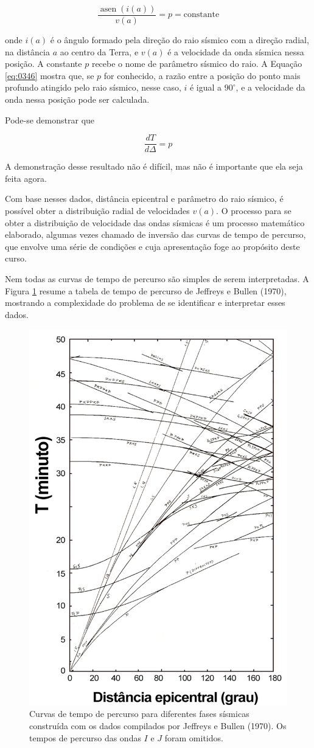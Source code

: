\documentclass[]{book}
\theoremstyle{definition}
\theoremstyle{definition}
\theoremstyle{definition}
\theoremstyle{remark}
\begin{document}
\begin{equation}
\frac{\operatorname{asen}(i(a))}{v(a)}=p= \mathrm{constante} \label{eq:0346}
\end{equation}

onde \(i(a)\) é o ângulo formado pela direção do raio sísmico com a direção radial, na distância \(a\) ao centro da Terra, e \(v(a)\) é a velocidade da onda sísmica nessa posição. A constante \(p\) recebe o nome de parâmetro sísmico do raio. A Equação \eqref{eq:0346} mostra que, se \(p\) for conhecido, a razão entre a posição do ponto mais profundo atingido pelo raio sísmico, nesse caso, \(i\) é igual a \(90^\circ\), e a velocidade da onda nessa posição pode ser calculada.

Pode-se demonstrar que

\begin{equation}
\frac{d T}{d \Delta}=p \label{eq:0347}
\end{equation}

A demonstração desse resultado não é difícil, mas não é importante que ela seja feita agora.

Com base nesses dados, distância epicentral e parâmetro do raio sísmico, é possível obter a distribuição radial de velocidades \(v(a)\). O processo para se obter a distribuição de velocidade das ondas sísmicas é um processo matemático elaborado, algumas vezes chamado de inversão das curvas de tempo de percurso, que envolve uma série de condições e cuja apresentação foge ao propósito deste curso.

Nem todas as curvas de tempo de percurso são simples de serem interpretadas. A Figura \ref{fig:usp0416} resume a tabela de tempo de percurso de Jeffreys e Bullen (1970), mostrando a complexidade do problema de se identificar e interpretar esses dados.

\begin{figure}

{\centering \includegraphics[width=0.5\linewidth]{fig/figU16} 

}

\caption{Curvas de tempo de percurso para diferentes fases sísmicas construída com os dados compilados por Jeffreys e Bullen (1970). Os tempos de percurso das ondas $I$ e $J$ foram omitidos.}\label{fig:usp0416}
\end{figure}
\end{document}
